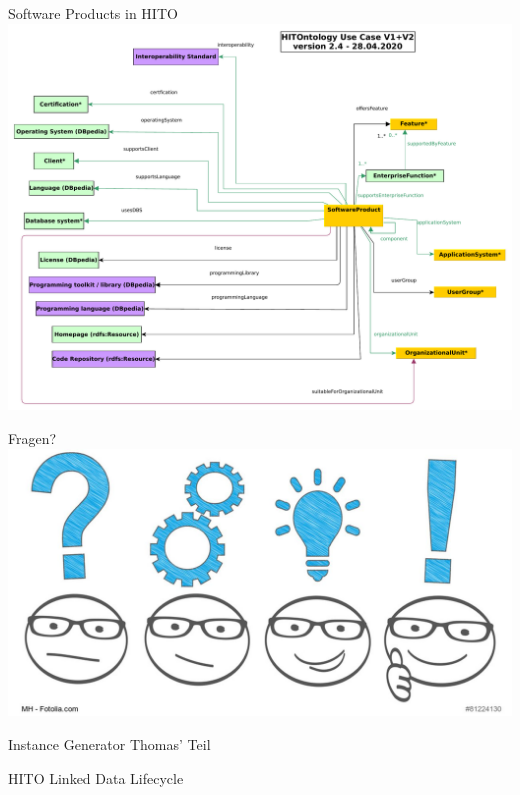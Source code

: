 \documentclass[aspectratio=1610,12pt]{beamer}
\begin{document}
\begin{frame}{Software Products in HITO}
\centering
\includegraphics[height=.8\textheight]{img/excerpt2.pdf}
\end{frame}

\begin{frame}{Fragen?}
  \centering
  \vspace{-0.5cm}
  \includegraphics[width=\textwidth]{img/fragen.png}
\end{frame}

\begin{frame}{Instance Generator}
  \centering
  \huge Thomas' Teil
\end{frame}

\begin{frame}{HITO Linked Data Lifecycle}
  \centering
  \vspace{-0.5cm}
\end{frame}
\end{document}
